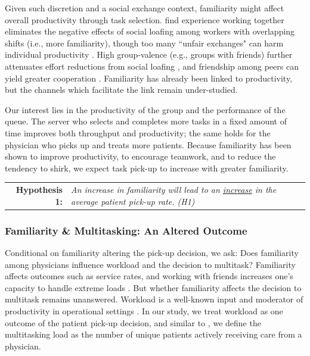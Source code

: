  Given such discretion and a social exchange context, familiarity might affect overall productivity through task selection. \cite{Mas2009} find experience working together eliminates the negative effects of social loafing among workers with overlapping shifts (i.e., more familiarity), though too many “unfair exchanges" can harm individual productivity \citep{Kamalahmadi2021}. High group-valence (e.g., groups with friends) further attenuates effort reductions from social loafing \citep{Karau1993}, and friendship among peers can yield greater cooperation \citep{Bandiera2005}. Familiarity has already been linked to productivity, but the channels which facilitate the link remain under-studied.
 
 Our interest lies in the productivity of the group and the performance of the queue. The server who selects and completes more tasks in a fixed amount of time improves both throughput and productivity; the same holds for the physician who picks up and treats more patients. Because familiarity has been shown to improve productivity, to encourage teamwork, and to reduce the tendency to shirk, we expect task pick-up to increase with greater familiarity.
 
 \medskip \noindent
 \begin{tabularx}{\linewidth}{ r X }
    \textbf{Hypothesis 1:} & \textit{An increase in familiarity will lead to an \underline{increase} in the average patient pick-up rate. (H1)} 
 \end{tabularx}   %
 
 \subsubsection{Familiarity \& Multitasking: An Altered Outcome} 
 Conditional on familiarity altering the pick-up decision, we ask: Does familiarity among physicians influence workload and the decision to multitask? Familiarity affects outcomes such as service rates, and working with friends increases one's capacity to handle extreme loads \citep{Bandiera2010,Hamilton2003}. But whether familiarity affects the decision to multitask remains unanswered. Workload is a well-known input and moderator of productivity in operational settings \citep[e.g.,][]{Schultz1998,Delasay2018}. In our study, we treat workload as one outcome of the patient pick-up decision, and similar to \cite{KC2014}, we define the multitasking load as the number of unique patients actively receiving care from a physician.
 
